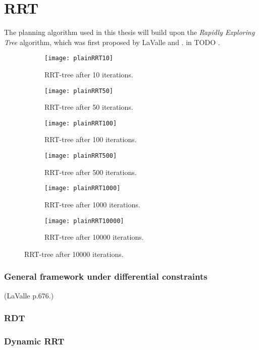 \chapter{RRT}

The planning algorithm used in this thesis will build upon the \textit{Rapidly
  Exploring Tree} algorithm, which was first proposed by LaValle and . in TODO
\cite{TODO}.

\begin{figure}
  \centering
  \begin{subfigure}[b]{0.3\textwidth}
    \texttt{[image: plainRRT10]}
    \caption{RRT-tree after 10 iterations.}
  \end{subfigure}
  \begin{subfigure}[b]{0.3\textwidth}
    \texttt{[image: plainRRT50]}
    \caption{RRT-tree after 50 iterations.}
  \end{subfigure}
  \begin{subfigure}[b]{0.3\textwidth}
    \texttt{[image: plainRRT100]}
    \caption{RRT-tree after 100 iterations.}
  \end{subfigure}
  \newline %
  \begin{subfigure}[b]{0.3\textwidth}
    \texttt{[image: plainRRT500]}
    \caption{RRT-tree after 500 iterations.}
  \end{subfigure}
  \begin{subfigure}[b]{0.3\textwidth}
    \texttt{[image: plainRRT1000]}
    \caption{RRT-tree after 1000 iterations.}
  \end{subfigure}
  \begin{subfigure}[b]{0.3\textwidth}
    \texttt{[image: plainRRT10000]}
    \caption{RRT-tree after 10000 iterations.}
  \end{subfigure}
\end{figure}

\subsection{General framework under differential constraints} (LaValle p.676.)


\subsection{RDT}


\subsection{Dynamic RRT}

